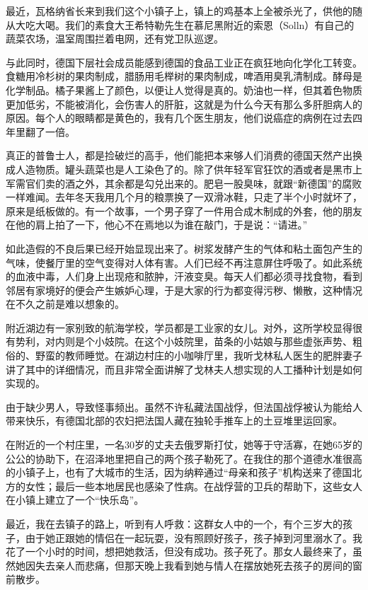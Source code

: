 \documentclass[UTF8]{ctexart}
\begin{document}
最近，瓦格纳省长来到我们这个小镇子上，镇上的鸡基本上全被杀光了，供他的随从大吃大喝。我们的素食大王希特勒先生在慕尼黑附近的索恩（Solln）有自己的蔬菜农场，温室周围拦着电网，还有党卫队巡逻。

与此同时，德国下层社会成员能感到德国的食品工业正在疯狂地向化学化工转变。食糖用冷杉树的果肉制成，腊肠用毛榉树的果肉制成，啤酒用臭乳清制成。酵母是化学制品。橘子果酱上了颜色，以便让人觉得是真的。奶油也一样，但其着色物质更加低劣，不能被消化，会伤害人的肝脏，这就是为什么今天有那么多肝胆病人的原因。每个人的眼睛都是黄色的，我有几个医生朋友，他们说癌症的病例在过去四年里翻了一倍。

真正的普鲁士人，都是捡破烂的高手，他们能把本来够人们消费的德国天然产出换成人造物质。罐头蔬菜也是人工染色了的。除了供年轻军官狂饮的酒或者是黑市上军需官们卖的酒之外，其余都是勾兑出来的。肥皂一股臭味，就跟“新德国”的腐败一样难闻。去年冬天我用几个月的粮票换了一双滑冰鞋，只走了半个小时就坏了，原来是纸板做的。有一个故事，一个男子穿了一件用合成木制成的外套，他的朋友在他的肩上拍了一下，他心不在焉地以为谁在敲门，于是说：“请进。”

如此造假的不良后果已经开始显现出来了。树浆发酵产生的气体和粘土面包产生的气味，使餐厅里的空气变得对人体有害。人们已经不再注意屏住呼吸了。如此系统的血液中毒，人们身上出现疮和脓肿，汗液变臭。每天人们都必须寻找食物，看到邻居有家境好的便会产生嫉妒心理，于是大家的行为都变得污秽、懒散，这种情况在不久之前是难以想象的。

附近湖边有一家别致的航海学校，学员都是工业家的女儿。对外，这所学校显得很有势利，对内则是个小妓院。在这个小妓院里，苗条的小姑娘与那些虚张声势、粗俗的、野蛮的教师睡觉。在湖边村庄的小咖啡厅里，我听戈林私人医生的肥胖妻子讲了其中的详细情况，而且非常全面讲解了戈林夫人想实现的人工播种计划是如何实现的。

由于缺少男人，导致怪事频出。虽然不许私藏法国战俘，但法国战俘被认为能给人带来快乐，有德国北部的农妇把法国人藏在独轮手推车上的土豆堆里运回家。

在附近的一个村庄里，一名30岁的丈夫去俄罗斯打仗，她等于守活寡，在她65岁的公公的协助下，在沼泽地里把自己的两个孩子勒死了。在我住的那个道德水准很高的小镇子上，也有了大城市的生活，因为纳粹通过“母亲和孩子”机构送来了德国北方的女性；最后一些本地居民也感染了性病。在战俘营的卫兵的帮助下，这些女人在小镇上建立了一个“快乐岛”。

最近，我在去镇子的路上，听到有人呼救：这群女人中的一个，有个三岁大的孩子，由于她正跟她的情侣在一起玩耍，没有照顾好孩子，孩子掉到河里溺水了。我花了一个小时的时间，想把她救活，但没有成功。孩子死了。那女人最终来了，虽然她因失去亲人而悲痛，但那天晚上我看到她与情人在摆放她死去孩子的房间的窗前散步。
\end{document}
